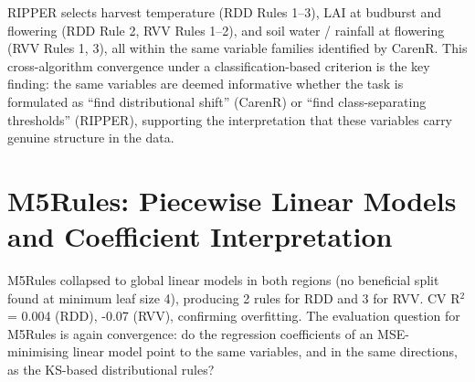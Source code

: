 RIPPER selects harvest temperature (RDD Rules 1--3), LAI at budburst and flowering (RDD Rule 2, RVV Rules 1--2), and soil water / rainfall at flowering (RVV Rules 1, 3), all within the same variable families identified by CarenR. This cross-algorithm convergence under a classification-based criterion is the key finding: the same variables are deemed informative whether the task is formulated as ``find distributional shift'' (CarenR) or ``find class-separating thresholds'' (RIPPER), supporting the interpretation that these variables carry genuine structure in the data.


\section{M5Rules: Piecewise Linear Models and Coefficient Interpretation}\label{sec:m5rules_piecewise_linear_models}

M5Rules collapsed to global linear models in both regions (no beneficial split found at minimum leaf size 4), producing 2 rules for RDD and 3 for RVV. CV R$^2$ = 0.004 (RDD), -0.07 (RVV), confirming overfitting. The evaluation question for M5Rules is again convergence: do the regression coefficients of an MSE-minimising linear model point to the same variables, and in the same directions, as the KS-based distributional rules?


